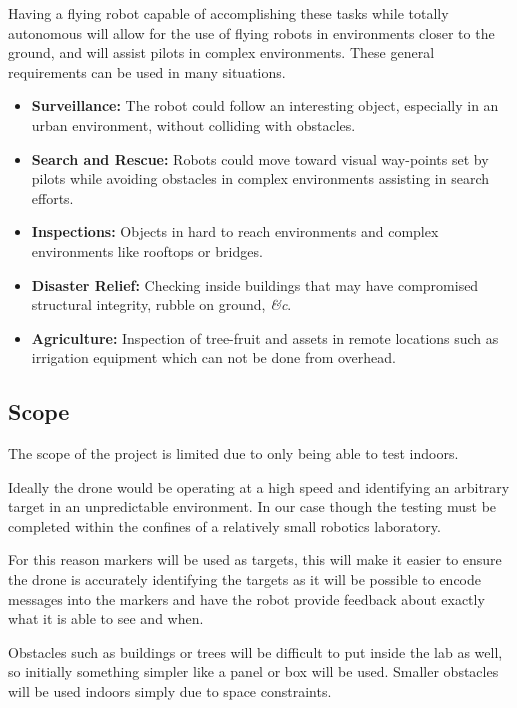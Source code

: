 \documentclass{article}
\begin{document}
		Having a flying robot capable of accomplishing these tasks while totally autonomous will allow for the use of flying robots in environments closer to the ground, and will assist pilots in complex environments. These general requirements can be used in many situations.
		
		\begin{itemize}
			\item \textbf{Surveillance:} The robot could follow an interesting object, especially in an urban environment, without colliding with obstacles.
			\item \textbf{Search and Rescue:} Robots could move toward visual way-points set by pilots while avoiding obstacles in complex environments assisting in search efforts.
			\item \textbf{Inspections:} Objects in hard to reach environments and complex environments like rooftops or bridges.
			\item \textbf{Disaster Relief:} Checking inside buildings that may have compromised structural integrity, rubble on ground, \textit{\&c}.
			\item \textbf{Agriculture:} Inspection of tree-fruit and assets in remote locations such as irrigation equipment which can not be done from overhead.
		\end{itemize}
		
	\subsection{Scope}
	
	The scope of the project is limited due to only being able to test indoors.
	
	Ideally the drone would be operating at a high speed and identifying an arbitrary target in an unpredictable environment. In our case though the testing must be completed within the confines of a relatively small robotics laboratory. 
	
	For this reason markers will be used as targets, this will make it easier to ensure the drone is accurately identifying the targets as it will be possible to encode messages into the markers and have the robot provide feedback about exactly what it is able to see and when.
	
	Obstacles such as buildings or trees will be difficult to put inside the lab as well, so initially something simpler like a panel or box will be used. Smaller obstacles will be used indoors simply due to space constraints.
	
\end{document}
